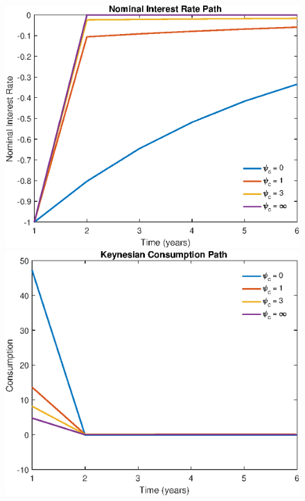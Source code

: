 \documentclass[titlepage]{\econtex}\newcommand{\texname}{ConsumptionHeterogeneity}
\begin{document}
\begin{figure} 
	\begin{centering}
		\includegraphics[scale=0.4]{../Matlab/DynareCode/Figures/TANK_capital_IRF_i.eps}
		\includegraphics[scale=0.4]{../Matlab/DynareCode/Figures/TANK_capital_IRF_c_K.eps}

\end{centering}
\end{figure}
\end{document}
